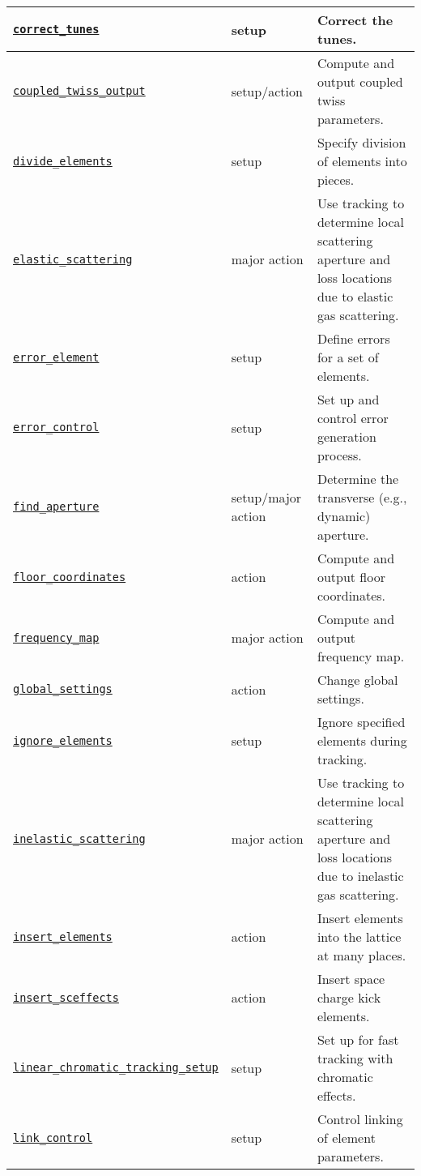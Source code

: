 \documentclass[11pt]{article}
\begin{document}
\begin{longtable}{|p{2.75in}|p{0.75in}|p{2.75in}|}
\hyperref[subsec:correcttunes]{\tt correct\_tunes} & setup & Correct the tunes. \\ \hline
\hyperref[subsec:coupledtwissoutput]{\tt coupled\_twiss\_output} & setup/action & Compute and output coupled twiss parameters. \\ \hline
\hyperref[subsec:divideelements]{\tt divide\_elements} & setup & Specify division of elements into pieces. \\ \hline
\hyperref[subsec:elasticscattering]{\tt elastic\_scattering} & major action & Use tracking to determine local scattering aperture and loss locations due to elastic gas scattering.\\ \hline
\hyperref[subsec:errorelement]{\tt error\_element} & setup & Define errors for a set of elements. \\ \hline
\hyperref[subsec:errorcontrol]{\tt error\_control} & setup & Set up and control error generation process. \\ \hline
\hyperref[subsec:findaperture]{\tt find\_aperture} & setup/major action & Determine the transverse (e.g., dynamic) aperture. \\ \hline
\hyperref[subsec:floorcoordinates]{\tt floor\_coordinates} & action & Compute and output floor coordinates. \\ \hline
\hyperref[subsec:frequencymap]{\tt frequency\_map} & major action & Compute and output frequency map. \\ \hline
\hyperref[subsec:globalsettings]{\tt global\_settings} & action & Change global settings.\\ \hline
\hyperref[subsec:ignoreelements]{\tt ignore\_elements} & setup & Ignore specified elements during tracking. \\ \hline
\hyperref[subsec:inelasticscattering]{\tt inelastic\_scattering} & major action & Use tracking to determine local scattering aperture and loss locations due to inelastic gas scattering.\\ \hline
\hyperref[subsec:insertelements]{\tt insert\_elements} & action & Insert elements into the lattice at many places. \\ \hline
\hyperref[subsec:insertsceffects]{\tt insert\_sceffects} & action & Insert space charge kick elements. \\ \hline
\hyperref[subsec:linearchromatictrackingsetup]{\tt linear\_chromatic\_tracking\_setup} & setup & Set up for fast tracking with chromatic effects. \\ \hline
\hyperref[subsec:linkcontrol]{\tt link\_control} & setup & Control linking of element parameters. \\ \hline

\end{longtable}
\end{document}
